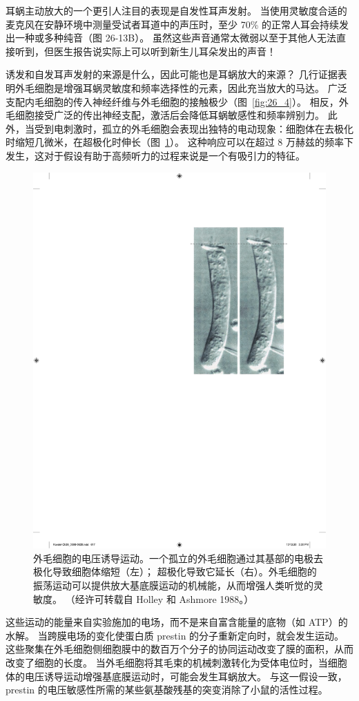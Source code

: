 耳蜗主动放大的一个更引人注目的表现是自发性耳声发射。
当使用灵敏度合适的麦克风在安静环境中测量受试者耳道中的声压时，至少 70\% 的正常人耳会持续发出一种或多种纯音（图 26-13B）。
虽然这些声音通常太微弱以至于其他人无法直接听到，但医生报告说实际上可以听到新生儿耳朵发出的声音！


诱发和自发耳声发射的来源是什么，因此可能也是耳蜗放大的来源？
几行证据表明外毛细胞是增强耳蜗灵敏度和频率选择性的元素，因此充当放大的马达。
广泛支配内毛细胞的传入神经纤维与外毛细胞的接触极少（图~\ref{fig:26_4}）。
相反，外毛细胞接受广泛的传出神经支配，激活后会降低耳蜗敏感性和频率辨别力。
此外，当受到电刺激时，孤立的外毛细胞会表现出独特的电动现象：细胞体在去极化时缩短几微米，在超极化时伸长（图~\ref{fig:26_14}）。
这种响应可以在超过 8 万赫兹的频率下发生，这对于假设有助于高频听力的过程来说是一个有吸引力的特征。


\begin{figure}[htbp]
	\centering
	\includegraphics[width=0.5\linewidth]{chap26/fig_26_14}
	\caption{外毛细胞的电压诱导运动。一个孤立的外毛细胞通过其基部的电极去极化导致细胞体缩短（左）； 超极化导致它延长（右）。外毛细胞的振荡运动可以提供放大基底膜运动的机械能，从而增强人类听觉的灵敏度。 （经许可转载自 Holley 和 Ashmore 1988。）}
	\label{fig:26_14}
\end{figure}


这些运动的能量来自实验施加的电场，而不是来自富含能量的底物（如 ATP）的水解。
当跨膜电场的变化使蛋白质 prestin 的分子重新定向时，就会发生运动。
这些聚集在外毛细胞侧细胞膜中的数百万个分子的协同运动改变了膜的面积，从而改变了细胞的长度。
当外毛细胞将其毛束的机械刺激转化为受体电位时，当细胞体的电压诱导运动增强基底膜运动时，可能会发生耳蜗放大。
与这一假设一致，prestin 的电压敏感性所需的某些氨基酸残基的突变消除了小鼠的活性过程。


